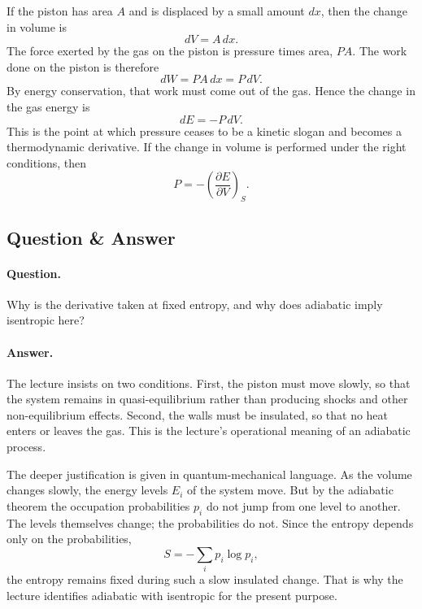 If the piston has area \(A\) and is displaced by a small amount \(dx\), then the change in volume is
\begin{equation}
dV = A\,dx.
\end{equation}
The force exerted by the gas on the piston is pressure times area, \(PA\). The work done on the piston is therefore
\begin{equation}
dW = P A\,dx = P\,dV.
\end{equation}
By energy conservation, that work must come out of the gas. Hence the change in the gas energy is
\begin{equation}
dE = -P\,dV.
\end{equation}
This is the point at which pressure ceases to be a kinetic slogan and becomes a thermodynamic derivative. If the change in volume is performed under the right conditions, then
\begin{equation}
P = -\left(\frac{\partial E}{\partial V}\right)_S.
\end{equation}

\subsection{Question \& Answer}

\paragraph{Question.} Why is the derivative taken at fixed entropy, and why does adiabatic imply isentropic here?

\paragraph{Answer.} The lecture insists on two conditions. First, the piston must move slowly, so that the system remains in quasi-equilibrium rather than producing shocks and other non-equilibrium effects. Second, the walls must be insulated, so that no heat enters or leaves the gas. This is the lecture's operational meaning of an adiabatic process.

The deeper justification is given in quantum-mechanical language. As the volume changes slowly, the energy levels \(E_i\) of the system move. But by the adiabatic theorem the occupation probabilities \(p_i\) do not jump from one level to another. The levels themselves change; the probabilities do not. Since the entropy depends only on the probabilities,
\begin{equation}
S = -\sum_i p_i \log p_i,
\end{equation}
the entropy remains fixed during such a slow insulated change. That is why the lecture identifies adiabatic with isentropic for the present purpose.

